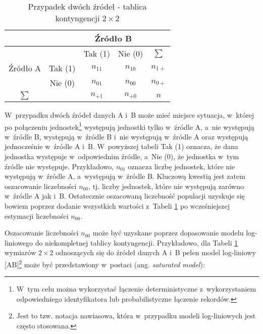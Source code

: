 \documentclass[12pt,a4paper]{article}
\begin{document}
\begin{table}[ht]
\centering
\caption{Przypadek dwóch źródeł - tablica kontyngencji $2\times 2$}\label{tab1}
\begin{tabular}{l|lll|l}
\hline
\multicolumn{1}{c|}{} & \multicolumn{1}{c}{} & \multicolumn{2}{c|}{Źródło B} & \multicolumn{1}{c}{} \\ 
\hline
\multicolumn{1}{c|}{} & \multicolumn{1}{c}{} & \multicolumn{1}{c}{Tak (1)} & \multicolumn{1}{c|}{Nie (0)} & \multicolumn{1}{c}{$\sum$} \\ 
\multicolumn{1}{c|}{Źródło A} & \multicolumn{1}{c}{Tak (1)} & \multicolumn{1}{c}{$n_{11}$} & \multicolumn{1}{c|}{$n_{10}$} & \multicolumn{1}{c}{$n_{1+}$} \\ 
\multicolumn{1}{c|}{} & \multicolumn{1}{c}{Nie (0)} & \multicolumn{1}{c}{$n_{01}$} & \multicolumn{1}{c|}{$n_{00}$} & \multicolumn{1}{c}{$n_{0+}$} \\ 
\hline
\multicolumn{1}{c|}{$\sum$} & \multicolumn{1}{c}{} & \multicolumn{1}{c}{$n_{+1}$} & \multicolumn{1}{c|}{$n_{+0}$} & \multicolumn{1}{c}{$n$} \\ 
\hline
\end{tabular}
\end{table}


W~przypadku dwóch źródeł danych A i~B może mieć miejsce sytuacja, w~której po połączeniu jednostek\footnote{W~tym celu można wykorzystać łączenie deterministyczne z~wykorzystaniem odpowiedniego identyfikatora lub probabilistyczne łączenie rekordów.} występują jednostki tylko w~źródle A, a~nie występują w~źródle B, występują w~źródle B i~nie występują w~źródle A oraz występują jednocześnie w~źródle A i~B. W~powyższej tabeli Tak (1) oznacza, że dana jednostka występuje w~odpowiednim źródle, a~Nie (0), że jednostka w~tym źródle nie występuje. Przykładowo, $n_{01}$ oznacza liczbę jednostek, które nie występują w~źródle A, a~występują w~źródle B. Kluczową kwestią jest zatem oszacowanie liczebności $n_{00}$, tj. liczby jednostek, które nie występują zarówno w~źródle A jak i~B. Ostatecznie oszacowaną liczebność populacji uzyskuje się bowiem poprzez dodanie wszystkich wartości z~Tabeli \ref{tab1} po wcześniejszej estymacji liczebności $n_{00}$. 

Oszacowanie liczebności $n_{00}$ może być uzyskane poprzez dopasowanie modelu log-liniowego do niekompletnej tablicy kontyngencji. Przykładowo, dla Tabeli \ref{tab1} wymiarów $2\times 2$ odnoszących się do źródeł danych A i~B pełen model log-liniowy [AB]\footnote{Jest to tzw. notacja nawiasowa, która w~przypadku modeli log-liniowych jest często stosowana.} może być przedstawiony w~postaci (ang. \textit{saturated model}):
\end{document}
